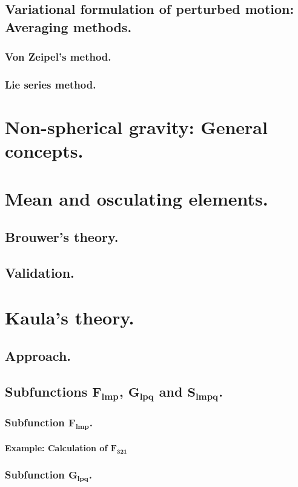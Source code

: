 	\subsection{Variational formulation of perturbed motion: Averaging methods.}
		\subsubsection{Von Zeipel's method.}
		\subsubsection{Lie series method.}
\section{Non-spherical gravity: General concepts.}
%
%
\section{Mean and osculating elements.}
%
%
	\subsection{Brouwer's theory.}
	\subsection{Validation.}
\section{Kaula's theory.}
%
%
	\subsection{Approach.}
	\subsection{Subfunctions $\bm{F_{lmp}}$, $\bm{ G_{lpq}}$ and $\bm{ S_{lmpq}}$.}
		\subsubsection{Subfunction $\bm{F_{lmp}}$.}
		\paragraph{Example: Calculation of $\bm{F_{321}}$}
		\subsubsection{Subfunction $\bm{G_{lpq}}$.}
